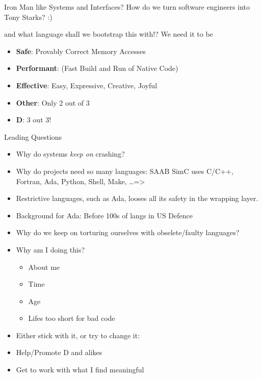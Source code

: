 \documentclass[xcolor=dvipsnames]{beamer}
\begin{document}
\begin{frame}[fragile]{Iron Man like Systems and Interfaces?}
  How do we turn software engineers into Tony Starks? :)
  \begin{figure}
  \end{figure}
  and what language shall we bootstrap this with!? We need it to be
  \begin{itemize}[<+->]
  \item \textbf{Safe}: Provably Correct Memory Accesses
  \item \textbf{Performant}: (Fast Build and Run of Native Code)
  \item \textbf{Effective}: Easy, Expressive, Creative, Joyful
  \end{itemize}

  \begin{itemize}[<+->]
  \item \textbf{Other}: Only 2 out of 3
  \item \textbf{D}: 3 out 3!
  \end{itemize}
\end{frame}

\begin{frame}[fragile]{Leading Questions}
  \begin{itemize}[<+->]
  \item Why do systems \emph{keep on} crashing?
  \item Why do projects need so many languages: SAAB SimC uses C/C++, Fortran,
    Ada, Python, Shell, Make, \ldots =>
  \item Restrictive languages, such as Ada, looses all its safety in the
    wrapping layer.
  \item Background for Ada: Before 100s of langs in US Defence
  \item Why do we keep on torturing ourselves with obselete/faulty languages?
  \item Why am I doing this?
    \begin{itemize}[<+->]
    \item About me
    \item Time
    \item Age
    \item Lifes too short for bad code
    \end{itemize}
  \item Either stick with it, or try to change it:
  \item Help/Promote D and alikes
  \item Get to work with what I find meaningful
  \end{itemize}
\end{frame}
\end{document}
